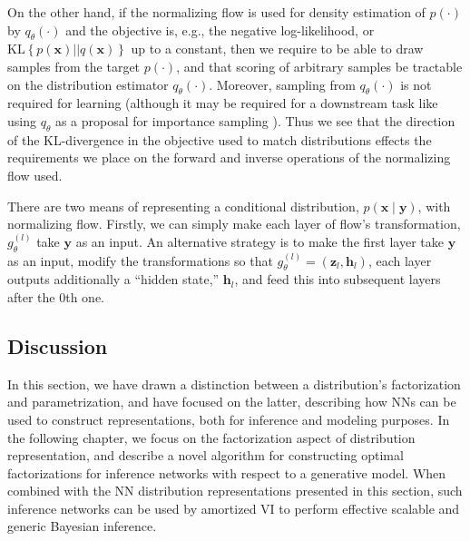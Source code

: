 On the other hand, if the normalizing flow is used for density estimation of $p(\cdot)$ by $q_\theta(\cdot)$ and the objective is, e.g., the negative log-likelihood, or $\text{KL}\left\{p(\mathbf{x})||q(\mathbf{x})\right\}$ up to a constant, then we require to be able to draw samples from the target $p(\cdot)$, and that scoring of arbitrary samples be tractable on the distribution estimator $q_\theta(\cdot)$. Moreover, sampling from $q_\theta(\cdot)$ is not required for learning (although it may be required for a downstream task like using $q_\theta$ as a proposal for importance sampling \citep{PaigeWood2016}). Thus we see that the direction of the KL-divergence in the objective used to match distributions effects the requirements we place on the forward and inverse operations of the normalizing flow used.

There are two means of representing a conditional distribution, $p(\mathbf{x}\mid\mathbf{y})$, with normalizing flow. Firstly, we can simply make each layer of flow's transformation, $g^{(l)}_\theta$ take $\mathbf{y}$ as an input. An alternative strategy is to make the first layer take $\mathbf{y}$ as an input, modify the transformations so that $g^{(l)}_\theta=(\mathbf{z}_l,\mathbf{h}_l)$, each layer outputs additionally a ``hidden state,'' $\mathbf{h}_l$, and feed this into subsequent layers after the $0$th one. %

\subsection{Discussion}
In this section, we have drawn a distinction between a distribution's factorization and parametrization, and have focused on the latter, describing how NNs can be used to construct representations, both for inference and modeling purposes. In the following chapter, we focus on the factorization aspect of distribution representation, and describe a novel algorithm for constructing optimal factorizations for inference networks with respect to a generative model. When combined with the NN distribution representations presented in this section, such inference networks can be used by amortized VI to perform effective scalable and generic Bayesian inference.